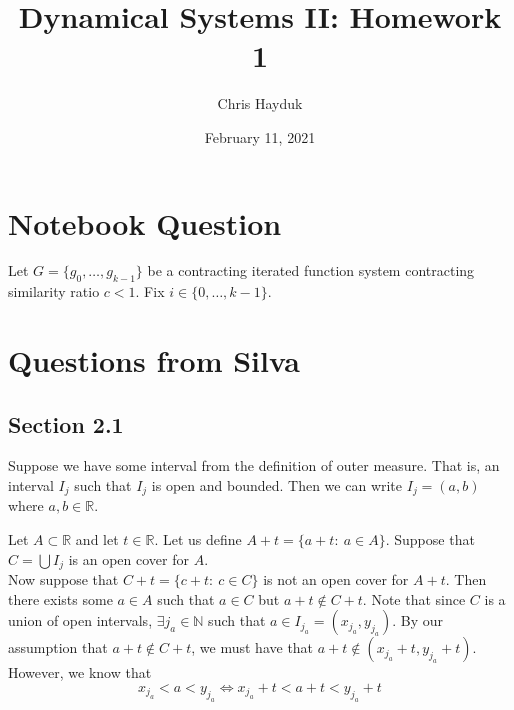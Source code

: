 \documentclass[12pt]{article}
\newenvironment{problem}[2][Problem]{\begin{trivlist}
\item[\hskip \labelsep {\bfseries #1}\hskip \labelsep {\bfseries #2.}]}{\end{trivlist}}
\begin{document}
\title{Dynamical Systems II: Homework 1}

\author{Chris Hayduk}
\date{February 11, 2021}

\maketitle

\section{Notebook Question}

\begin{problem}{1}
\end{problem}

Let $G = \{g_0, \ldots, g_{k-1}\}$ be a contracting iterated function system contracting similarity ratio $c < 1$. Fix $i \in \{0, \ldots, k-1\}$.

\begin{problem}{2}
\end{problem}

\begin{problem}{3}
\end{problem}

\section{Questions from Silva}

\subsection{Section 2.1}

\begin{problem}{3}
\end{problem}

Suppose we have some interval from the definition of outer measure. That is, an interval $I_j$ such that $I_j$ is open and bounded. Then we can write $I_j = (a, b)$ where $a, b \in \mathbb{R}$.

\begin{problem}{4}
\end{problem}

Let $A \subset \mathbb{R}$ and let $t \in \mathbb{R}$. Let us define $A + t = \{a + t: \ a \in A\}$. Suppose that $C = \bigcup I_j$ is an open cover for $A$.\\

Now suppose that $C + t = \{c + t: \ c \in C\}$ is not an open cover for $A + t$. Then there exists some $a \in A$ such that $a \in C$ but $a + t \not\in C + t$. Note that since $C$ is a union of open intervals, $\exists j_a \in \mathbb{N}$ such that $a \in I_{j_a} = (x_{j_a}, y_{j_a})$. By our assumption that $a + t \not\in C + t$, we must have that $a + t \not\in (x_{j_a} + t, y_{j_a} + t)$. However, we know that $$x_{j_a} < a < y_{j_a} \iff x_{j_a} + t < a + t < y_{j_a} + t$$
\end{document}
